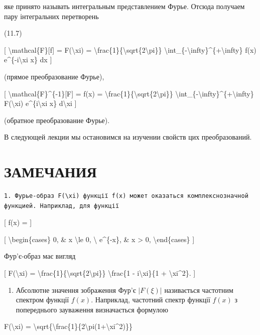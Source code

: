 \documentclass[
]{article}
\providecommand{\tightlist}{%
  \setlength{\itemsep}{0pt}\setlength{\parskip}{0pt}}
\begin{document}
яке принято называть интегральным представлением Фурье. Отсюда получаем
пару інтегральних перетворень

(11.7)

{[} \textbackslash mathcal\{F\}{[}f{]} = F(\textbackslash xi) =
\textbackslash frac\{1\}\{\textbackslash sqrt\{2\textbackslash pi\}\}
\textbackslash int\_\{-\textbackslash infty\}\^{}\{+\textbackslash infty\}
f(x) e\^{}\{-i\textbackslash xi x\} dx {]}

(прямое преобразование Фурье),

{[} \textbackslash mathcal\{F\}\^{}\{-1\}{[}F{]} = f(x) =
\textbackslash frac\{1\}\{\textbackslash sqrt\{2\textbackslash pi\}\}
\textbackslash int\_\{-\textbackslash infty\}\^{}\{+\textbackslash infty\}
F(\textbackslash xi) e\^{}\{i\textbackslash xi x\} d\textbackslash xi
{]}

(обратное преобразование Фурье).

В следующей лекции мы остановимся на изучении свойств цих
преобразований.

\section{ЗАМЕЧАНИЯ}\label{ux437ux430ux43cux435ux447ux430ux43dux438ux44f}

\begin{verbatim}
1. Фурье-образ F(\xi) функції f(x) может оказаться комплекснозначной функцией. Наприклад, для функції
\end{verbatim}

{[} f(x) = {]}

{[} \textbackslash begin\{cases\} 0, \& x \textbackslash le 0,
\textbackslash{} e\^{}\{-x\}, \& x \textgreater{} 0,
\textbackslash end\{cases\} {]}

Фур'є-образ має вигляд

{[} F(\textbackslash xi) =
\textbackslash frac\{1\}\{\textbackslash sqrt\{2\textbackslash pi\}\}
\textbackslash frac\{1 - i\textbackslash xi\}\{1 +
\textbackslash xi\^{}2\}. {]}

\begin{enumerate}
\def\labelenumi{\arabic{enumi}.}
\setcounter{enumi}{1}
\tightlist
\item
  Абсолютне значення зображення Фур'є \(|F(\xi)|\) називається частотним
  спектром функції \(f(x)\). Наприклад, частотний спектр функції
  \(f(x)\) з попереднього зауваження визначається формулою
\end{enumerate}

\textbar F(\textbackslash xi)\textbar{} =
\textbackslash sqrt\{\textbackslash frac\{1\}\{2\textbackslash pi(1+\textbackslash xi\^{}2)\}\}
\end{document}
